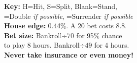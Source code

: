 \documentclass[letterpaper]{article}
\begin{document}
{\begin{minipage}[t][81mm][t]{49.5mm}
        \textbf{Key:} H=Hit,\; S=Split,\; Blank=Stand,\\
        {
            \setlength{\fboxsep}{2pt}
            \colorbox{doubleblue}{\phantom{I}}=Double \textit{if possible}, 
            \colorbox{surrenderred}{\phantom{I}}=Surrender \textit{if possible}
        }\\
        \textbf{House edge:} 0.44\%. A \textdollar\(20\) bet costs \(8.8\)\textcent.\\
        \textbf{Bet size:} Bankroll\(\div70\) for 95\% chance\\
        to play 8 hours. Bankroll\(\div49\) for 4 hours.\\
        \textbf{Never take insurance or even money!}
    \end{minipage}
}
\end{document}
